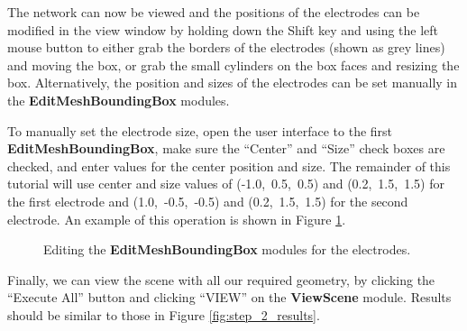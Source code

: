 \documentclass[fleqn,11pt,openany]{book}
\begin{document}
The network can now be viewed and the positions of the electrodes can
be modified in the view window by holding down the Shift key and using
the left mouse button to either grab the borders of the electrodes
(shown as grey lines) and moving the box, or grab the small cylinders
on the box faces and resizing the box. Alternatively, the position and
sizes of the electrodes can be set manually in the {\bf
EditMeshBoundingBox} modules.

To manually set the electrode size, open the user interface to the
first {\bf EditMeshBoundingBox}, make sure the ``Center'' and ``Size''
check boxes are checked, and enter values for the center position and
size. The remainder of this tutorial will use center and size values
of (-1.0,~0.5,~0.5) and (0.2,~1.5,~1.5) for the first electrode and
(1.0,~-0.5,~-0.5) and (0.2,~1.5,~1.5) for the second electrode. An
example of this operation is shown in Figure
\ref{fig:network_2_edit_mesh}.

\begin{figure}
\caption{Editing the {\bf EditMeshBoundingBox} modules for the
electrodes.}\label{fig:network_2_edit_mesh}
\end{figure}

Finally, we can view the scene with all our required geometry, by
clicking the ``Execute All'' button and clicking ``VIEW'' on the {\bf
ViewScene} module. Results should be similar to those in Figure
\ref{fig:step_2_results}.
\end{document}
